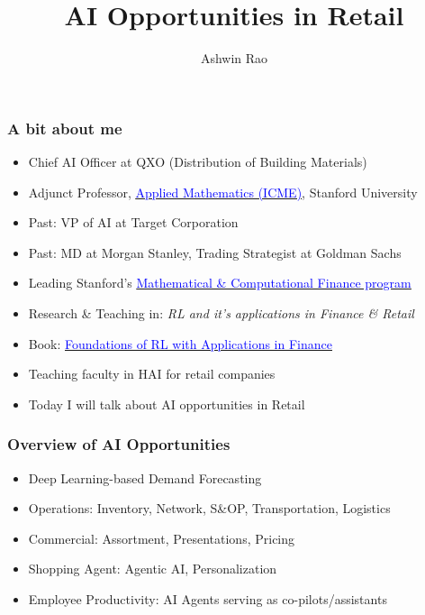 \documentclass[handout]{beamer}
\title[AI in Retail]{AI Opportunities in Retail} %
\author{Ashwin Rao} %
\institute[Stanford] %
{Stanford University
}
\date{} %
\begin{document}
\begin{frame}
\titlepage %
\end{frame}



\begin{frame}
\frametitle{A bit about me}
\pause
\begin{itemize}[<+->]
\item Chief AI Officer at QXO (Distribution of Building Materials)
\item Adjunct Professor, \href{https://icme.stanford.edu/}{\underline{\textcolor{blue}{Applied Mathematics (ICME)}}}, Stanford University
\item Past: VP of AI at Target Corporation
\item Past: MD at Morgan Stanley, Trading Strategist at Goldman Sachs
\item Leading Stanford's \href{https://mcf.stanford.edu/}{\underline{\textcolor{blue}{Mathematical \& Computational Finance program}}}
\item Research \& Teaching in: {\em RL and it's applications in Finance \& Retail}
\item Book:  \href{https://www.amazon.com/Foundations-Reinforcement-Learning-Applications-Finance/dp/1032124121}{\underline{\textcolor{blue}{Foundations of RL with Applications in Finance}}}
\item Teaching faculty in HAI for retail companies
\item Today I will talk about AI opportunities in Retail
\end{itemize}
\end{frame}

\begin{frame}
\frametitle{Overview of AI Opportunities}
\pause
\begin{itemize}[<+->]
\item Deep Learning-based Demand Forecasting
\item Operations: Inventory, Network, S\&OP, Transportation, Logistics
\item Commercial: Assortment, Presentations, Pricing
\item Shopping Agent: Agentic AI, Personalization
\item Employee Productivity: AI Agents serving as co-pilots/assistants
\end{itemize}
\end{frame}
\end{document}
